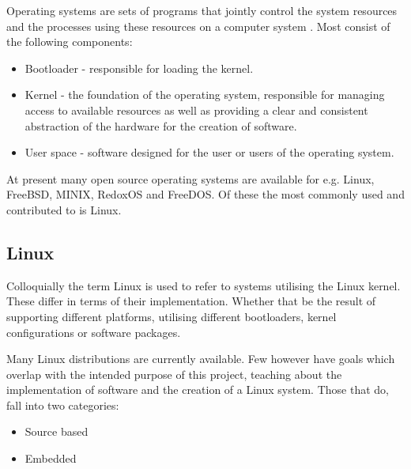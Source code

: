 Operating systems are sets of programs that jointly control the system resources and the processes using these resources on a computer system \cite{oxford-os,cambridge-os}. Most consist of the following components:

% 
% 


\begin{itemize}
    \item Bootloader - responsible for loading the kernel.
    \item Kernel - the foundation of the operating system, responsible for managing access to available resources as well as providing a clear and consistent abstraction of the hardware for the creation of software.
    \item User space - software designed for the user or users of the operating system.
\end{itemize}


At present many open source operating systems are available for e.g. Linux, FreeBSD, MINIX, RedoxOS and FreeDOS. Of these the most commonly used and contributed to is Linux.

\subsection{Linux}

Colloquially the term Linux is used to refer to systems utilising the Linux kernel. These differ in terms of their implementation. Whether that be the result of supporting different platforms, utilising different bootloaders, kernel configurations or software packages.

Many Linux distributions are currently available. Few however have goals which overlap with the intended purpose of this project, teaching about the implementation of software and the creation of a Linux system. Those that do, fall into two categories:

\begin{itemize}
    \item Source based
    \item Embedded
\end{itemize}

